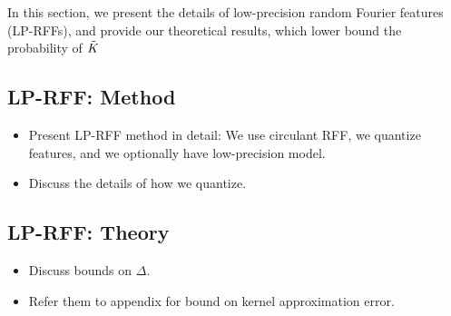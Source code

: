 In this section, we present the details of low-precision random Fourier features (LP-RFFs), and provide our theoretical results, which lower bound the probability of $\tilde{K}$

\subsection{LP-RFF: Method}
\begin{itemize}
	\item Present LP-RFF method in detail: We use circulant RFF, we quantize features, and we optionally have low-precision model.
	\item Discuss the details of how we quantize.
\end{itemize}
\subsection{LP-RFF: Theory}
\begin{itemize}
	\item Discuss bounds on $\Delta$.
	\item Refer them to appendix for bound on kernel approximation error.
\end{itemize}